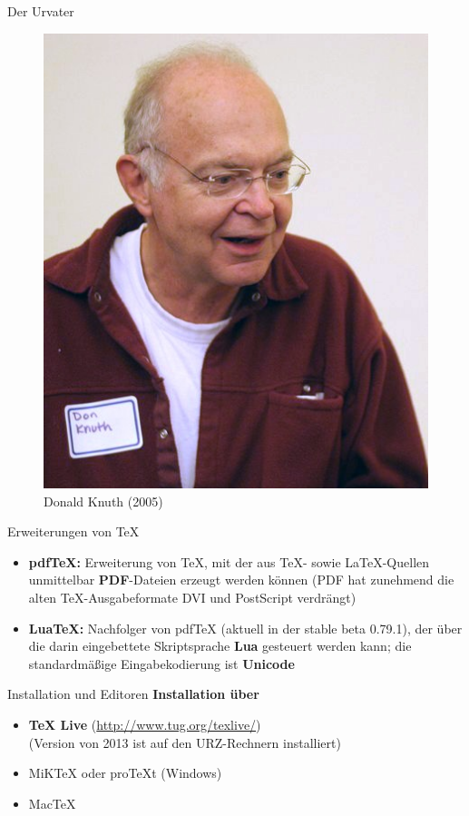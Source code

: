 \documentclass[11pt]{beamer}
\begin{document}
\begin{frame}{Der Urvater}
\begin{figure}
\centering
\includegraphics[scale=.45]{KnuthAtOpenContentAlliance}
\caption{Donald Knuth (2005)}
\end{figure}
\end{frame}

\begin{frame}{Erweiterungen von {\TeX}}
\begin{itemize}
\item \textbf{pdfTeX:} Erweiterung von {\TeX}, mit der aus {\TeX}- sowie {\LaTeX}-Quellen unmittelbar \textbf{PDF}-Dateien erzeugt werden können (PDF hat zunehmend die {\glqq}alten{\grqq} {\TeX}-Ausgabeformate DVI und PostScript verdrängt)
\item \textbf{LuaTeX:} Nachfolger von pdfTeX (aktuell in der stable beta 0.79.1), der über die darin eingebettete Skriptsprache \textbf{Lua} gesteuert werden kann; die standardmäßige Eingabekodierung ist \textbf{Unicode}
\end{itemize}
\end{frame}

{

}

\begin{frame}{Installation und Editoren}
\textbf{Installation über}

\smallskip
\begin{itemize}
\item \textbf{TeX Live} (\url{http://www.tug.org/texlive/})\\
(Version von 2013 ist auf den URZ-Rechnern installiert)
\item MiKTeX oder proTeXt (Windows)
\item MacTeX
\end{itemize}
\end{frame}
\end{document}
